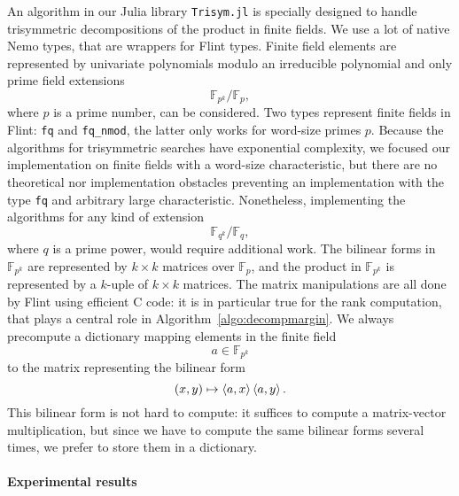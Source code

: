 An algorithm in our Julia library \texttt{Trisym.jl} is specially designed to
handle trisymmetric decompositions of the product in finite fields. We use a lot
of native Nemo types, that are wrappers for Flint types. Finite field elements
are represented by univariate polynomials modulo an irreducible polynomial and
only prime field extensions
\[
  \mathbb{F}_{p^k}/\mathbb{F}_p,
\]
where $p$ is a prime number, can be considered.
Two types represent finite fields in Flint: \texttt{fq} and
\texttt{fq\_nmod}, the latter only works for word-size primes $p$. Because the
algorithms for trisymmetric searches have exponential complexity, we focused
our implementation on finite fields with a word-size characteristic, but there
are no theoretical nor implementation obstacles preventing an
implementation with the type \texttt{fq} and arbitrary large characteristic.
Nonetheless, implementing the algorithms for any kind of extension
\[
  \mathbb{F}_{q^k}/\mathbb{F}_q,
\]
where $q$ is a prime power, would require additional work.
The
bilinear forms in $\mathbb{F}_{p^k}$ are represented by $k\times k$ matrices
over $\mathbb{F}_p$, and the product in $\mathbb{F}_{p^k}$ is represented by a
$k$-uple of $k\times k$ matrices. The matrix manipulations are all done by Flint using
efficient C code: it is in particular true for the rank computation, that plays a central role
in Algorithm~\ref{algo:decompmargin}. We always precompute a dictionary mapping
elements in the finite field
\[
  a\in\mathbb{F}_{p^k}
\]
to the matrix representing the bilinear form
\[
  (x, y)\mapsto\left\langle a,x\right\rangle\left\langle a,y\right\rangle.
\]
This bilinear form is not hard to compute: it suffices to compute a
matrix-vector multiplication, but since we have to compute the same bilinear
forms several times, we prefer to store them in a dictionary.

\paragraph{Experimental results}

%

